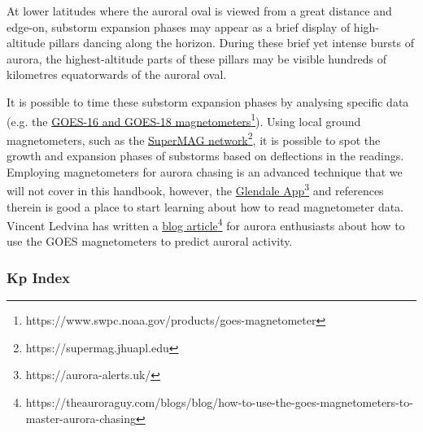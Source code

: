 \documentclass{article}
\begin{document}
At lower latitudes where the auroral oval is viewed from a great distance and edge-on, substorm expansion phases may appear as a brief display of high-altitude pillars dancing along the horizon. During these brief yet intense bursts of aurora, the highest-altitude parts of these pillars may be visible hundreds of kilometres equatorwards of the auroral oval.

It is possible to time these substorm expansion phases by analysing specific data (e.g. the \href{https://www.swpc.noaa.gov/products/goes-magnetometer}{GOES-16 and GOES-18 magnetometers}\footnote{https://www.swpc.noaa.gov/products/goes-magnetometer}). Using local ground magnetometers, such as the  \href{https://supermag.jhuapl.edu}{SuperMAG network}\footnote{https://supermag.jhuapl.edu}, it is possible to spot the growth and expansion phases of substorms based on deflections in the readings. Employing magnetometers for aurora chasing is an advanced technique that we will not cover in this handbook, however, the \href{https://aurora-alerts.uk/}{Glendale App}\footnote{https://aurora-alerts.uk/} and references therein is good a place to start learning about how to read magnetometer data. Vincent Ledvina has written a \href{https://theauroraguy.com/blogs/blog/how-to-use-the-goes-magnetometers-to-master-aurora-chasing}{blog article}\footnote{https://theauroraguy.com/blogs/blog/how-to-use-the-goes-magnetometers-to-master-aurora-chasing} for aurora enthusiasts about how to use the GOES magnetometers to predict auroral activity.

\subsubsection{Kp Index}\label{kp-index}
\end{document}
